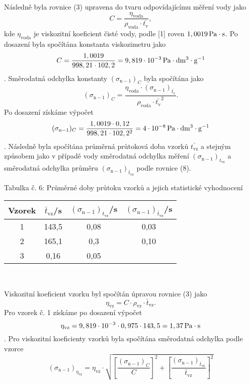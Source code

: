 \documentclass[12pt,a4paper]{article}
\def\ri#1{\mathrm{#1}}
\def\jd#1{\ifmmode\,\mathrm{#1}\else\,\textrm{#1}\fi}
\begin{document}
Následně byla rovnice (3) upravena do tvaru odpovídajícímu měření vody jako
\begin{equation}
C = \dfrac{\eta_\ri{voda}}{\rho_\ri{voda} \cdot \bar{t_\ri{v}}},
\end{equation}
kde $\eta_\ri{voda}$ je viskozitní koeficient čisté vody, podle [1] roven $1,0019\jd{Pa\cdot s}$. Po dosazení byla spočítána konstanta viskozimetru jako
$$C = \dfrac{1,0019}{998,21 \cdot 102,2} = 9,819\cdot 10^{-3}\jd{Pa\cdot dm^3 \cdot g^{-1}}$$.
Směrodatná odchylka konstanty $(\sigma_\ri{n-1})_C$ byla spočítána jako
\begin{equation}
	(\sigma_\ri{n-1})_C = \dfrac{\eta_\ri{voda}\cdot (\sigma_\ri{n-1})_{\bar{t_\ri{v}}}}{\rho_\ri{voda} \cdot \bar{t_\ri{v}}^2}.
\end{equation}
Po dosazení získáme výpočet
$$(\sigma_\ri{n-1})_C = \dfrac{1,0019\cdot 0,12}{998,21 \cdot 102,2^2} = 4\cdot 10^{-8}\jd{Pa\cdot dm^3\cdot g^{-1}}$$.
Následně byla spočítána průměrná průtoková doba vzorků $\bar{t_\ri{vz}}$ a stejným způsobem jako v případě vody směrodatná odchylka měření $(\sigma_\ri{n-1})_{t_\ri{vz}}$ a směrodatná odchylka průměru $(\sigma_\ri{n-1})_{\bar{t}_\ri{vz}}$ podle rovnice (8). \\
\begin{center}
	\noindent Tabulka č. 6: Průměrné doby průtoku vzorků a jejich statistické vyhodnocení\\
	\begin{tabular}{c|c|c|c}
		Vzorek & $\bar{t}_\ri{vz}$/s & $(\sigma_\ri{n-1})_{t_\ri{vz}}$/s & $(\sigma_\ri{n-1})_{\bar{t}_\ri{vz}}$/s\\
		\hline
		1 & 143,5 & 0,08 & 0,03\\
		2 & 165,1 & 0,3 & 0,10\\
		3 & 0,16 & 0,05\\
	\end{tabular}\\
\end{center}
Viskozitní koeficient vzorku byl spočítán úpravou rovnice (3) jako
\begin{equation}
\eta_\ri{vz} = C\cdot \rho_\ri{vz}\cdot \bar{t}_\ri{vz}.
\end{equation}
Pro vzorek č. 1 získáme po dosazení výpočet
$$\eta_\ri{vz} = 9,819\cdot 10^{-3}\cdot 0,975 \cdot 143,5 = 1,37\jd{Pa\cdot s}$$.
Pro viskozitní koeficienty vzorků byla spočítána směrodatná odchylka podle vzorce
\begin{equation}
	(\sigma_\ri{n-1})_{\eta_\ri{vz}} = \eta_\ri{vz} \cdot \sqrt{\left[\dfrac{(\sigma_\ri{n-1})_C}{C}\right]^2 + \left[\dfrac{(\sigma_\ri{n-1})_{\bar{t}_\ri{vz}}}{\bar{t}_\ri{vz}}\right]^2}
\end{equation}
\end{document}
